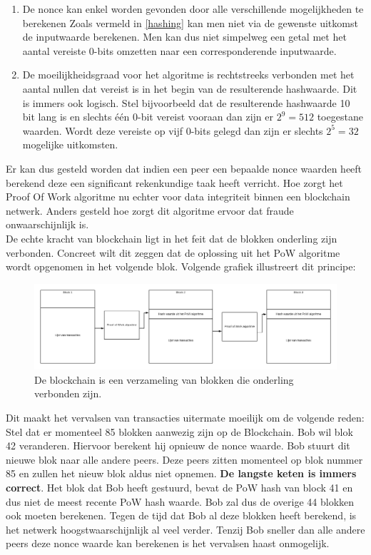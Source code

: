 \begin{enumerate}
	\item De nonce kan enkel worden gevonden door alle verschillende mogelijkheden te berekenen Zoals vermeld in \ref{hashing} kan men niet via de gewenste uitkomst de inputwaarde berekenen. Men kan dus niet simpelweg een getal met het aantal vereiste 0-bits omzetten naar een corresponderende inputwaarde.
	\item De moeilijkheidsgraad voor het algoritme is rechtstreeks verbonden met het aantal nullen dat vereist is in het begin van de resulterende hashwaarde. Dit is immers ook logisch. Stel bijvoorbeeld dat de resulterende hashwaarde 10 bit lang is en slechts één 0-bit vereist vooraan dan zijn er $2^9 = 512$ toegestane waarden. Wordt deze vereiste op vijf 0-bits gelegd dan zijn er slechts $2^5 = 32$ mogelijke uitkomsten.
\end{enumerate}

Er kan dus gesteld worden dat indien een peer een bepaalde nonce waarden heeft berekend deze een significant rekenkundige taak heeft verricht. Hoe zorgt het Proof Of Work algoritme nu echter voor data integriteit binnen een blockchain netwerk. Anders gesteld hoe zorgt dit algoritme ervoor dat fraude onwaarschijnlijk is.\\

De echte kracht van blockchain ligt in het feit dat de blokken onderling zijn verbonden. Concreet wilt dit zeggen dat de oplossing uit het PoW algoritme wordt opgenomen in het volgende blok. Volgende grafiek illustreert dit principe:

\begin{figure}[h!]
	\centering
		\includegraphics[scale=0.2]{blockchain-4.png}
	\caption[Blockchain - Voorstelling 4]{De blockchain is een verzameling van blokken die onderling verbonden zijn.}
\end{figure}

Dit maakt het vervalsen van transacties uitermate moeilijk om de volgende reden:\\

Stel dat er momenteel 85 blokken aanwezig zijn op de Blockchain. Bob wil blok 42 veranderen. Hiervoor berekent hij opnieuw de nonce waarde. Bob stuurt dit nieuwe blok naar alle andere peers. Deze peers zitten momenteel op blok nummer 85 en zullen het nieuw blok aldus niet opnemen. \textbf{De langste keten is immers correct}. Het blok dat Bob heeft gestuurd, bevat de PoW hash van block 41 en dus niet de meest recente PoW hash waarde. Bob zal dus de overige 44 blokken ook moeten berekenen. Tegen de tijd dat Bob al deze blokken heeft berekend, is het netwerk hoogstwaarschijnlijk al veel verder. Tenzij Bob sneller dan alle andere peers deze nonce waarde kan berekenen is het vervalsen haast onmogelijk.\\

